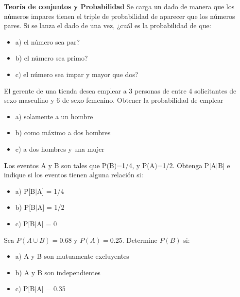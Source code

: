 \documentclass{../oxmathproblems}
\begin{document}
\begin{questions}

\miquestion \textbf{Teoría de conjuntos y Probabilidad} Se carga un dado de manera que los números impares tienen el triple de probabilidad de aparecer que  los números pares. Si se lanza el dado de una vez, ¿cuál es la probabilidad de que: 
\begin{itemize}
\item  a) el número sea par?
\item  b) el número sea primo?
\item  c) el número sea impar y mayor que dos?
\end{itemize}

\miquestion El gerente de una tienda desea emplear a 3 personas de entre 4 solicitantes de sexo masculino y 6 de sexo femenino. Obtener la probabilidad de emplear 
\begin{itemize}
\item  a) solamente a un hombre
\item  b) como máximo a dos hombres
\item  c) a dos hombres y una  mujer
\end{itemize}



\miquestion \textbf Los eventos A y B son tales que P(B)=1/4, y P(A)=1/2. Obtenga P[A$\mid$B] e indique si los eventos tienen alguna relación si: 
\begin{itemize}
 \item a) P[B$\mid$A] = 1/4
 \item b) P[B$\mid$A] = 1/2
 \item  c) P[B$\mid$A] = 0
\end{itemize}



\miquestion Sea $P(A \cup B)=0.68$ y $P(A)= 0.25$. Determine $P(B)$ si:
\begin{itemize}
 \item a) A y B son mutuamente excluyentes 
 \item b) A y B son independientes
 \item  c) P[B$\mid$A] = 0.35 
\end{itemize}


\end{questions}
\end{document}
